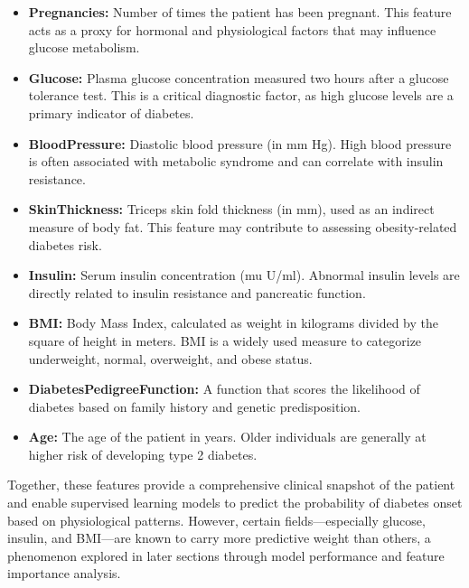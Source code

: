\documentclass[12pt]{article}
\begin{document}
\begin{itemize}
    \item \textbf{Pregnancies:} Number of times the patient has been pregnant. This feature acts as a proxy for hormonal and physiological factors that may influence glucose metabolism.
    
    \item \textbf{Glucose:} Plasma glucose concentration measured two hours after a glucose tolerance test. This is a critical diagnostic factor, as high glucose levels are a primary indicator of diabetes.
    
    \item \textbf{BloodPressure:} Diastolic blood pressure (in mm Hg). High blood pressure is often associated with metabolic syndrome and can correlate with insulin resistance.
    
    \item \textbf{SkinThickness:} Triceps skin fold thickness (in mm), used as an indirect measure of body fat. This feature may contribute to assessing obesity-related diabetes risk.
    
    \item \textbf{Insulin:} Serum insulin concentration (mu U/ml). Abnormal insulin levels are directly related to insulin resistance and pancreatic function.
    
    \item \textbf{BMI:} Body Mass Index, calculated as weight in kilograms divided by the square of height in meters. BMI is a widely used measure to categorize underweight, normal, overweight, and obese status.
    
    \item \textbf{DiabetesPedigreeFunction:} A function that scores the likelihood of diabetes based on family history and genetic predisposition.
    
    \item \textbf{Age:} The age of the patient in years. Older individuals are generally at higher risk of developing type 2 diabetes.
\end{itemize}

Together, these features provide a comprehensive clinical snapshot of the patient and enable supervised learning models to predict the probability of diabetes onset based on physiological patterns. However, certain fields—especially glucose, insulin, and BMI—are known to carry more predictive weight than others, a phenomenon explored in later sections through model performance and feature importance analysis.
\end{document}
